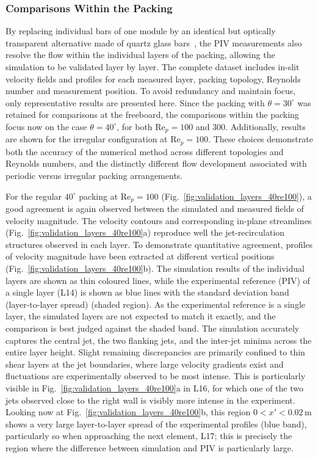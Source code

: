 \subsubsection{Comparisons Within the Packing}
\label{sec:validation:layers}

By replacing individual bars of one module by an identical but optically transparent alternative made of quartz glass bars~\cite{velten2026}, the PIV measurements also resolve the flow within the individual layers of the packing, allowing the simulation to be validated layer by layer. The complete dataset includes in-slit velocity fields and profiles for each measured layer, packing topology, Reynolds number and measurement position. To avoid redundancy and maintain focus, only representative results are presented here. Since the packing with $\theta=30^\circ$ was retained for comparisons at the freeboard, the comparisons within the packing focus now on the case $\theta=40^\circ$, for both Re$_p=100$ and $300$. Additionally, results are shown for the irregular configuration at Re$_p=100$. These choices demonstrate both the accuracy of the numerical method across different topologies and Reynolds numbers, and the distinctly different flow development associated with periodic versus irregular packing arrangements.

For the regular $40^\circ$ packing at Re$_p=100$ (Fig.~\ref{fig:validation_layers_40re100}), a good agreement is again observed between the simulated and measured fields of velocity magnitude. The velocity contours and corresponding in-plane streamlines (Fig.~\ref{fig:validation_layers_40re100}a) reproduce well the jet-recirculation structures observed in each layer. To demonstrate quantitative agreement, profiles of velocity magnitude have been extracted at different vertical positions (Fig.~\ref{fig:validation_layers_40re100}b). The simulation results of the individual layers are shown as thin coloured lines, while the experimental reference (PIV) of a single layer (L14) is shown as blue lines with the standard deviation band (layer-to-layer spread) (shaded region). As the experimental reference is a single layer, the simulated layers are not expected to match it exactly, and the comparison is best judged against the shaded band. The simulation accurately captures the central jet, the two flanking jets, and the inter-jet minima across the entire layer height. Slight remaining discrepancies are primarily confined to thin shear layers at the jet boundaries, where large velocity gradients exist and fluctuations are experimentally observed to be most intense. This is particularly visible in Fig.~\ref{fig:validation_layers_40re100}a in L16, for which one of the two jets observed close to the right wall is visibly more intense in the experiment. Looking now at Fig.~\ref{fig:validation_layers_40re100}b, this region $0<x'<0.02$\,m shows a very large layer-to-layer spread of the experimental profiles (blue band), particularly so when approaching the next element, L17; this is precisely the region where the difference between simulation and PIV is particularly large.

